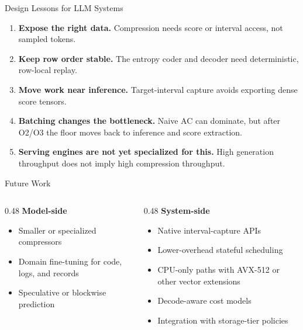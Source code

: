 \begin{frame}{Design Lessons for LLM Systems}
  \begin{enumerate}
    \item \textbf{Expose the right data.} Compression needs score or interval access, not sampled tokens.

    \vspace{0.4em}
    \item \textbf{Keep row order stable.} The entropy coder and decoder need deterministic, row-local replay.

    \vspace{0.4em}
    \item \textbf{Move work near inference.} Target-interval capture avoids exporting dense score tensors.

    \vspace{0.4em}
    \item \textbf{Batching changes the bottleneck.} Naive AC can dominate, but after O2/O3 the floor moves back to inference and score extraction.

    \vspace{0.4em}
    \item \textbf{Serving engines are not yet specialized for this.} High generation throughput does not imply high compression throughput.
  \end{enumerate}
\end{frame}

\begin{frame}{Future Work}
  \begin{columns}[T, onlytextwidth]
    \begin{column}{0.48\textwidth}
      \textbf{Model-side}
      \begin{itemize}
        \item Smaller or specialized compressors
        \item Domain fine-tuning for code, logs, and records
        \item Speculative or blockwise prediction
      \end{itemize}
    \end{column}
    \hfill
    \begin{column}{0.48\textwidth}
      \textbf{System-side}
      \begin{itemize}
        \item Native interval-capture APIs
        \item Lower-overhead stateful scheduling
        \item CPU-only paths with AVX-512 or other vector extensions
        \item Decode-aware cost models
        \item Integration with storage-tier policies
      \end{itemize}
    \end{column}
  \end{columns}
\end{frame}

